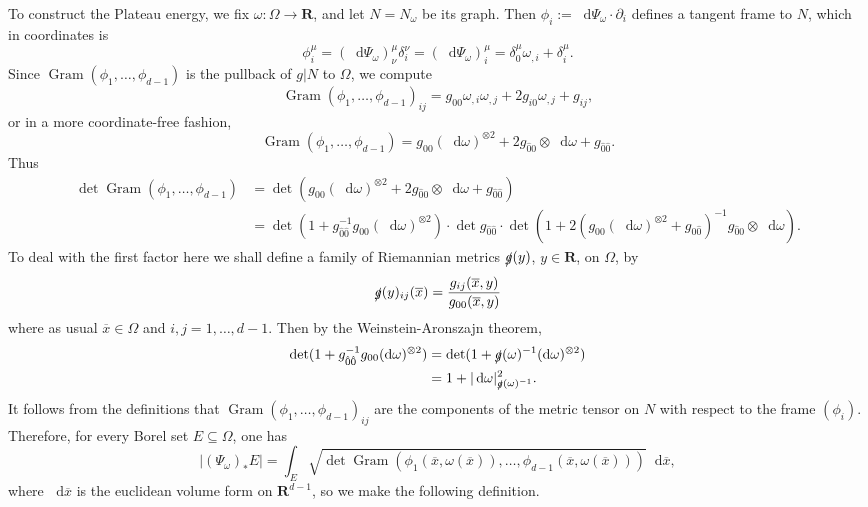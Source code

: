 \documentclass[reqno,12pt,letterpaper]{amsart}
\newcommand{\RR}{\mathbf{R}}
\newcommand*\dif{\mathop{}\!\mathrm{d}}
\DeclareMathOperator{\Gram}{Gram}
\theoremstyle{definition}
\numberwithin{equation}{section}
\begin{document}
To construct the Plateau energy, we fix $\omega: \Omega \to \RR$, and let $N = N_\omega$ be its graph.
Then $\phi_i := \dif \Psi_\omega \cdot \partial_i$ defines a tangent frame to $N$, which in coordinates is 
\begin{equation}\label{vector in frame}
\phi_i^\mu = (\dif \Psi_\omega)_\nu^\mu \delta_i^\nu = (\dif \Psi_\omega)_i^\mu = \delta^\mu_0 \omega_{,i} + \delta_i^\mu.
\end{equation}
Since $\Gram(\phi_1, \dots, \phi_{d - 1})$ is the pullback of $g|N$ to $\Omega$, we compute
$$\Gram(\phi_1, \dots, \phi_{d - 1})_{ij} = g_{00} \omega_{,i} \omega_{,j} + 2g_{i0} \omega_{,j} + g_{ij},$$
or in a more coordinate-free fashion,
\begin{equation}\label{Gram form for a frame}
\Gram(\phi_1, \dots, \phi_{d - 1}) = g_{00} (\dif \omega)^{\otimes 2} + 2g_{\hat 00} \otimes \dif \omega + g_{\hat 0\hat 0}.
\end{equation}
Thus 
\begin{align*}
\det \Gram(\phi_1, \dots, \phi_{d - 1}) &= \det(g_{00} (\dif \omega)^{\otimes 2} + 2g_{\hat 00} \otimes \dif \omega + g_{\hat 0 \hat 0}) \\
&= \det(1 + g_{\hat 0\hat 0}^{-1} g_{00} (\dif \omega)^{\otimes 2}) \cdot \det g_{\hat 0\hat 0} \cdot \det(1 + 2(g_{00} (\dif \omega)^{\otimes 2} + g_{\hat 0\hat 0})^{-1} g_{\hat 00} \otimes \dif \omega).
\end{align*}
To deal with the first factor here we shall define a family of Riemannian metrics $\slashed g(y)$, $y \in \RR$, on $\Omega$, by 
\begin{equation}\label{slashed metric}
\slashed g(y)_{ij}(\overline x) = \frac{g_{ij}(\overline x, y)}{g_{00}(\overline x, y)}
\end{equation}
where as usual $\overline x \in \Omega$ and $i,j = 1, \dots, d - 1$.
Then by the Weinstein-Aronszajn theorem,
\begin{align*}
\det(1 + g_{\hat 0\hat 0}^{-1} g_{00} (\dif \omega)^{\otimes 2}) &= \det(1 + \slashed g(\omega)^{-1} (\dif \omega)^{\otimes 2}) \\
&= 1 + |\dif \omega|_{\slashed g(\omega)^{-1}}^2.
\end{align*}
It follows from the definitions that $\Gram(\phi_1, \dots, \phi_{d - 1})_{ij}$ are the components of the metric tensor on $N$ with respect to the frame $(\phi_i)$.
Therefore, for every Borel set $E \subseteq \Omega$, one has 
$$|(\Psi_\omega)_* E| = \int_E \sqrt{\det \Gram(\phi_1(\overline x, \omega(\overline x)), \dots, \phi_{d - 1}(\overline x, \omega(\overline x)))} \dif \overline x,$$
where $\dif \overline x$ is the euclidean volume form on $\RR^{d - 1}$, so we make the following definition.
\end{document}
